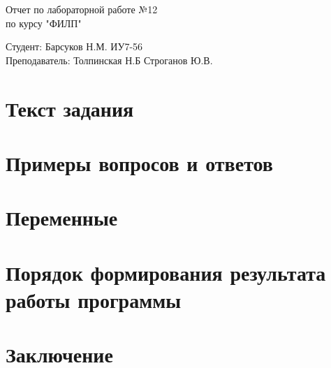\documentclass[a4paper, 14pt]{article}
\begin{document}
	\begin{titlepage}
		\begin{center}
			\begin{LARGE}
				Отчет по лабораторной работе №12\\
				по курсу "ФИЛП"\\
			\end{LARGE}
			
			\begin{Large}
				\vspace{10cm}
				Студент: Барсуков Н.М. ИУ7-56\\
				Преподаватель: Толпинская Н.Б
				Строганов Ю.В.
			\end{Large}
		\end{center}
	\end{titlepage}

	\newpage
	\tableofcontents
	
	\newpage
	\section{Текст задания}
	
	
	\section{Примеры вопросов и ответов}
	
	
	\newpage
	\section{Переменные}
	
	
	\newpage
	\section{Порядок формирования результата работы программы}
	
	
	\newpage
	\section{Заключение}
	
\end{document}
